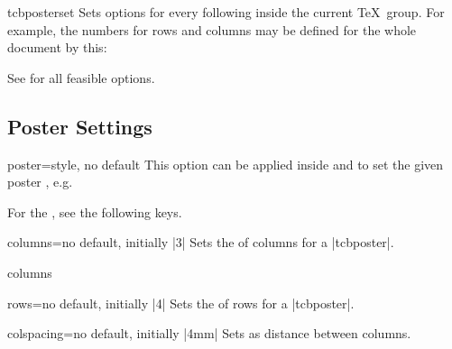 \medskip
\begin{docCommand}[doc new=2017-07-03]{tcbposterset}{}
  Sets options for every following  inside the current \TeX\ group.
  For example, the numbers for rows and columns may be defined for the whole document by this:
\begin{dispListing}
\end{dispListing}
  See  for all feasible options.
\end{docCommand}


\clearpage
\subsection{Poster Settings}\label{subsec:poster_settings}

\begin{postersetTcbKey}[][doc new=2017-07-03]{poster}{=}{style, no default}
  This option can be applied inside  and 
  to set the given poster , e.g.
\begin{dispListing}
\end{dispListing}
  For the , see the following keys.
\end{postersetTcbKey}


\begin{posterTcbKey}[][doc new=2017-07-03]{columns}{=}{no default, initially |3|}
  Sets the  of columns for a |tcbposter|.
\begin{exdispExample}{columns}
  \begin{tcbposter}[
    poster = {showframe,columns=5,rows=2,spacing=1mm,height=4cm},
  ]
  \end{tcbposter}
\end{exdispExample}
\end{posterTcbKey}

\begin{posterTcbKey}[][doc new=2017-07-03]{rows}{=}{no default, initially |4|}
  Sets the  of rows for a |tcbposter|.
\end{posterTcbKey}


\begin{posterTcbKey}[][doc new=2017-07-03]{colspacing}{=}{no default, initially |4mm|}
  Sets  as distance between columns.
\end{posterTcbKey}

